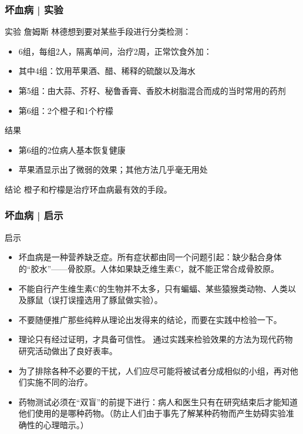 \begin{frame}
  \frametitle{坏血病 | 实验}
  \begin{block}{实验}
    詹姆斯 \textbullet 林德想到要对某些手段进行分类检测：
    \begin{itemize}
      \item 6组，每组2人，隔离单间，治疗2周，正常饮食外加：
      \item 其中4组：饮用苹果酒、醋、稀释的硫酸以及海水
      \item 第5组：由大蒜、芥籽、秘鲁香膏、香胶木树脂混合而成的当时常用的药剂
      \item 第6组：2个橙子和1个柠檬
    \end{itemize}
  \end{block}
  \vspace{-0.5em}
  \pause
  \begin{block}{结果}
    \begin{itemize}
      \item 第6组的2位病人基本恢复健康
      \item 苹果酒显示出了微弱的效果；其他方法几乎毫无用处
    \end{itemize}
  \end{block}
  \vspace{-0.5em}
  \pause
  \begin{block}{结论}
    橙子和柠檬是治疗环血病最有效的手段。
  \end{block}
\end{frame}

\begin{frame}
  \frametitle{坏血病 | 启示}
  \begin{block}{启示}
  \begin{itemize}
    \item 坏血病是一种营养缺乏症。所有症状都由同一个问题引起：缺少黏合身体的“胶水”——骨胶原。人体如果缺乏维生素C，就不能正常合成骨胶原。
    \item 不能自行产生维生素C的生物并不太多，只有蝙蝠、某些猿猴类动物、人类以及豚鼠（误打误撞选用了豚鼠做实验）。
    \item 不要随便推广那些纯粹从理论出发得来的结论，而要在实践中检验一下。
    \item \alert{理论只有经过证明，才具备可信性。} 通过实践来检验效果的方法为现代药物研究活动做出了良好表率。
    \item \alert{为了排除各种不必要的干扰，人们应尽可能将被试者分成相似的小组，再对他们实施不同的治疗。}
    \item \alert{药物测试必须在“双盲”的前提下进行}：病人和医生只有在研究结束后才能知道他们使用的是哪种药物。（防止人们由于事先了解某种药物而产生妨碍实验准确性的心理暗示。）
  \end{itemize}
  \end{block}
\end{frame}

